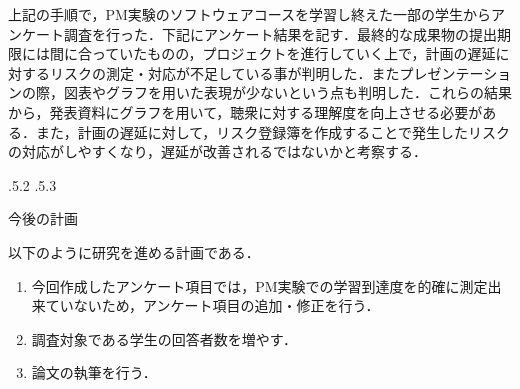 \documentclass[uplatex]{jsarticle}
\makeatletter
\renewcommand{\section}{%
    \if@slide\clearpage\fi
    \@startsection{section}{1}{\z@}%
    {\Cvs \@plus.5\Cdp \@minus.2\Cdp}%
    {.5\Cvs \@plus.3\Cdp}%
    {\normalfont\raggedright}}
\makeatother
\begin{document}
上記の手順で，PM実験のソフトウェアコースを学習し終えた一部の学生からアンケート調査を行った．下記にアンケート結果を記す．最終的な成果物の提出期限には間に合っていたものの，プロジェクトを進行していく上で，計画の遅延に対するリスクの測定・対応が不足している事が判明した．またプレゼンテーションの際，図表やグラフを用いた表現が少ないという点も判明した．これらの結果から，発表資料にグラフを用いて，聴衆に対する理解度を向上させる必要がある．また，計画の遅延に対して，リスク登録簿を作成することで発生したリスクの対応がしやすくなり，遅延が改善されるではないかと考察する．




\section{今後の計画}

以下のように研究を進める計画である．

\begin{enumerate}
\item 今回作成したアンケート項目では，PM実験での学習到達度を的確に測定出来ていないため，アンケート項目の追加・修正を行う．
\item 調査対象である学生の回答者数を増やす．
\item 論文の執筆を行う．
\end{enumerate}
\end{document}

